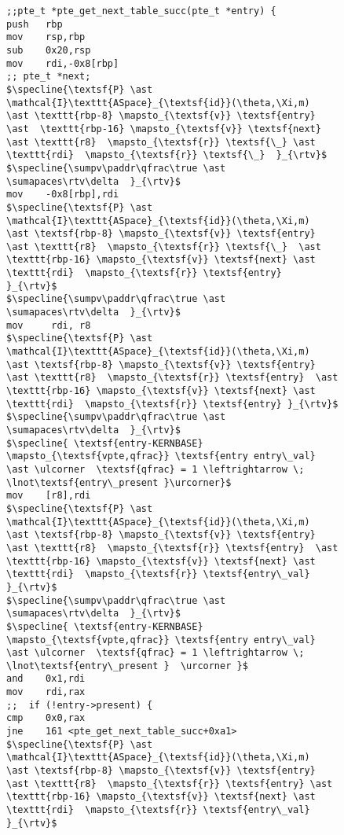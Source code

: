 \begin{figure}\footnotesize
  \begin{lstlisting}[mathescape]
;;pte_t *pte_get_next_table_succ(pte_t *entry) {
push   rbp
mov    rsp,rbp
sub    0x20,rsp
mov    rdi,-0x8[rbp]
;; pte_t *next;
$\specline{\textsf{P} \ast \mathcal{I}\texttt{ASpace}_{\textsf{id}}(\theta,\Xi,m)  \ast \texttt{rbp-8} \mapsto_{\textsf{v}} \textsf{entry} \ast  \texttt{rbp-16} \mapsto_{\textsf{v}} \textsf{next} \ast \texttt{r8}  \mapsto_{\textsf{r}} \textsf{\_} \ast \texttt{rdi}  \mapsto_{\textsf{r}} \textsf{\_}  }_{\rtv}$
$\specline{\sumpv\paddr\qfrac\true \ast \sumapaces\rtv\delta  }_{\rtv}$
mov    -0x8[rbp],rdi
$\specline{\textsf{P} \ast \mathcal{I}\texttt{ASpace}_{\textsf{id}}(\theta,\Xi,m)  \ast \textsf{rbp-8} \mapsto_{\textsf{v}} \textsf{entry} \ast \texttt{r8}  \mapsto_{\textsf{r}} \textsf{\_}  \ast  \texttt{rbp-16} \mapsto_{\textsf{v}} \textsf{next} \ast \texttt{rdi}  \mapsto_{\textsf{r}} \textsf{entry}  }_{\rtv}$
$\specline{\sumpv\paddr\qfrac\true \ast \sumapaces\rtv\delta  }_{\rtv}$
mov     rdi, r8
$\specline{\textsf{P} \ast \mathcal{I}\texttt{ASpace}_{\textsf{id}}(\theta,\Xi,m)  \ast \textsf{rbp-8} \mapsto_{\textsf{v}} \textsf{entry} \ast \texttt{r8}  \mapsto_{\textsf{r}} \textsf{entry}  \ast  \texttt{rbp-16} \mapsto_{\textsf{v}} \textsf{next} \ast \texttt{rdi}  \mapsto_{\textsf{r}} \textsf{entry} }_{\rtv}$
$\specline{\sumpv\paddr\qfrac\true \ast \sumapaces\rtv\delta  }_{\rtv}$
$\specline{ \textsf{entry-KERNBASE} \mapsto_{\textsf{vpte,qfrac}} \textsf{entry entry\_val} \ast \ulcorner  \textsf{qfrac} = 1 \leftrightarrow \; \lnot\textsf{entry\_present }\urcorner}$
mov    [r8],rdi
$\specline{\textsf{P} \ast \mathcal{I}\texttt{ASpace}_{\textsf{id}}(\theta,\Xi,m)  \ast \textsf{rbp-8} \mapsto_{\textsf{v}} \textsf{entry} \ast \texttt{r8}  \mapsto_{\textsf{r}} \textsf{entry}  \ast  \texttt{rbp-16} \mapsto_{\textsf{v}} \textsf{next} \ast \texttt{rdi}  \mapsto_{\textsf{r}} \textsf{entry\_val}   }_{\rtv}$
$\specline{\sumpv\paddr\qfrac\true \ast \sumapaces\rtv\delta  }_{\rtv}$
$\specline{ \textsf{entry-KERNBASE} \mapsto_{\textsf{vpte,qfrac}} \textsf{entry entry\_val} \ast \ulcorner  \textsf{qfrac} = 1 \leftrightarrow \; \lnot\textsf{entry\_present }  \urcorner }$
and    0x1,rdi
mov    rdi,rax
;;  if (!entry->present) {
cmp    0x0,rax
jne    161 <pte_get_next_table_succ+0xa1>
$\specline{\textsf{P} \ast \mathcal{I}\texttt{ASpace}_{\textsf{id}}(\theta,\Xi,m)  \ast \textsf{rbp-8} \mapsto_{\textsf{v}} \textsf{entry} \ast \texttt{r8}  \mapsto_{\textsf{r}} \textsf{entry} \ast \texttt{rbp-16} \mapsto_{\textsf{v}} \textsf{next} \ast \texttt{rdi}  \mapsto_{\textsf{r}} \textsf{entry\_val} }_{\rtv}$

\end{lstlisting}
\end{figure}
